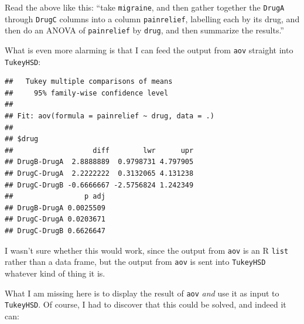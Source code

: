\documentclass[]{tufte-book}
\newenvironment{Shaded}{}{}
\newcommand{\DataTypeTok}[1]{\textcolor[rgb]{0.56,0.13,0.00}{#1}}
\newcommand{\KeywordTok}[1]{\textcolor[rgb]{0.00,0.44,0.13}{\textbf{#1}}}
\newcommand{\NormalTok}[1]{#1}
\newcommand{\OperatorTok}[1]{\textcolor[rgb]{0.40,0.40,0.40}{#1}}
\newcommand{\StringTok}[1]{\textcolor[rgb]{0.25,0.44,0.63}{#1}}
\theoremstyle{definition}
\theoremstyle{definition}
\theoremstyle{definition}
\theoremstyle{remark}
\begin{document}
Read the above like this: ``take \texttt{migraine}, and then gather
together the \texttt{DrugA} through \texttt{DrugC} columns into a column
\texttt{painrelief}, labelling each by its drug, and then do an ANOVA of
\texttt{painrelief} by \texttt{drug}, and then summarize the results.''

What is even more alarming is that I can feed the output from
\texttt{aov} straight into \texttt{TukeyHSD}:

\begin{Shaded}
\end{Shaded}

\begin{verbatim}
##   Tukey multiple comparisons of means
##     95% family-wise confidence level
## 
## Fit: aov(formula = painrelief ~ drug, data = .)
## 
## $drug
##                   diff        lwr      upr
## DrugB-DrugA  2.8888889  0.9798731 4.797905
## DrugC-DrugA  2.2222222  0.3132065 4.131238
## DrugC-DrugB -0.6666667 -2.5756824 1.242349
##                 p adj
## DrugB-DrugA 0.0025509
## DrugC-DrugA 0.0203671
## DrugC-DrugB 0.6626647
\end{verbatim}

I wasn't sure whether this would work, since the output from
\texttt{aov} is an R \texttt{list} rather than a data frame, but the
output from \texttt{aov} is sent into \texttt{TukeyHSD} whatever kind of
thing it is.

What I am missing here is to display the result of \texttt{aov}
\emph{and} use it as input to \texttt{TukeyHSD}. Of course, I had to
discover that this could be solved, and indeed it can:

\begin{Shaded}
\end{Shaded}
\end{document}
